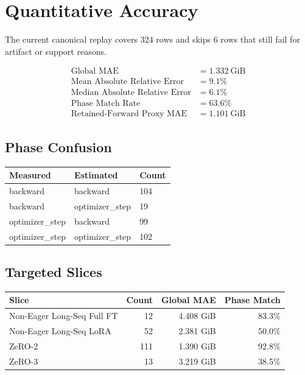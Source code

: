 \section{Quantitative Accuracy}
The current canonical replay covers 324 rows and skips 6 rows that still fail for artifact or support reasons.

\begin{align*}
\text{Global MAE} &= 1.332\ \mathrm{GiB} \\
\text{Mean Absolute Relative Error} &= 9.1\% \\
\text{Median Absolute Relative Error} &= 6.1\% \\
\text{Phase Match Rate} &= 63.6\% \\
\text{Retained-Forward Proxy MAE} &= 1.101\ \mathrm{GiB}
\end{align*}

\subsection{Phase Confusion}
\begin{center}
\begin{tabular}{lll}
\toprule
Measured & Estimated & Count \\
\midrule
backward & backward & 104 \\
backward & optimizer\_step & 19 \\
optimizer\_step & backward & 99 \\
optimizer\_step & optimizer\_step & 102 \\
\bottomrule
\end{tabular}
\end{center}

\subsection{Targeted Slices}
\begin{center}
\begin{tabular}{p{2.9in}rrr}
\toprule
Slice & Count & Global MAE & Phase Match \\
\midrule
Non-Eager Long-Seq Full FT & 12 & 4.408 GiB & 83.3\% \\
Non-Eager Long-Seq LoRA & 52 & 2.381 GiB & 50.0\% \\
ZeRO-2 & 111 & 1.390 GiB & 92.8\% \\
ZeRO-3 & 13 & 3.219 GiB & 38.5\% \\
\bottomrule
\end{tabular}
\end{center}
